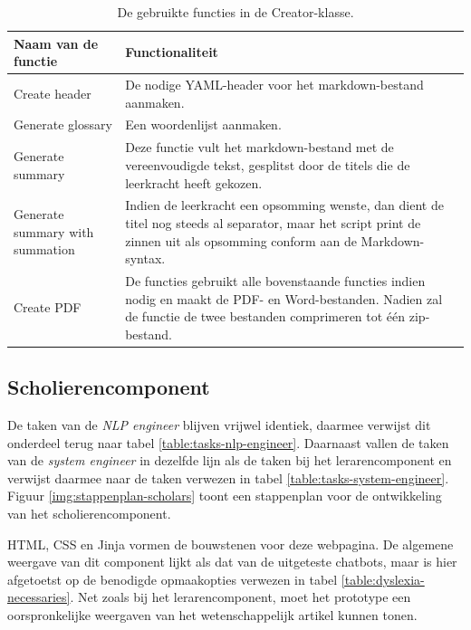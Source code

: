 \begin{table}[H]
	\begin{tabular}{ | m{5cm}| m{10cm} | }
		\hline
		Naam van de functie & Functionaliteit \\ \hline
		Create header & De nodige YAML-header voor het markdown-bestand aanmaken. \\ \hline
		Generate glossary & Een woordenlijst aanmaken. \\ \hline
		Generate summary & Deze functie vult het markdown-bestand met de vereenvoudigde tekst, gesplitst door de titels die de leerkracht heeft gekozen. \\ \hline
		Generate summary with summation & Indien de leerkracht een opsomming wenste, dan dient de titel nog steeds al separator, maar het script print de zinnen uit als opsomming conform aan de Markdown-syntax. \\ \hline
		Create PDF & De functies gebruikt alle bovenstaande functies indien nodig en maakt de PDF- en Word-bestanden. Nadien zal de functie de twee bestanden comprimeren tot één zip-bestand. \\ \hline
	\end{tabular}
	\caption{De gebruikte functies in de Creator-klasse.}
	\label{table:functions-creator-class}
\end{table}

\subsection{Scholierencomponent}

De taken van de \textit{NLP engineer} blijven vrijwel identiek, daarmee verwijst dit onderdeel terug naar tabel \ref{table:tasks-nlp-engineer}. Daarnaast vallen de taken van de \textit{system engineer} in dezelfde lijn als de taken bij het lerarencomponent en verwijst daarmee naar de taken verwezen in tabel \ref{table:tasks-system-engineer}. Figuur \ref{img:stappenplan-scholars} toont een stappenplan voor de ontwikkeling van het scholierencomponent.

\medspace

HTML, CSS en Jinja vormen de bouwstenen voor deze webpagina. De algemene weergave van dit component lijkt als dat van de uitgeteste chatbots, maar is hier afgetoetst op de benodigde opmaakopties verwezen in tabel \ref{table:dyslexia-necessaries}. Net zoals bij het lerarencomponent, moet het prototype een oorspronkelijke weergaven van het wetenschappelijk artikel kunnen tonen. 

\medspace


